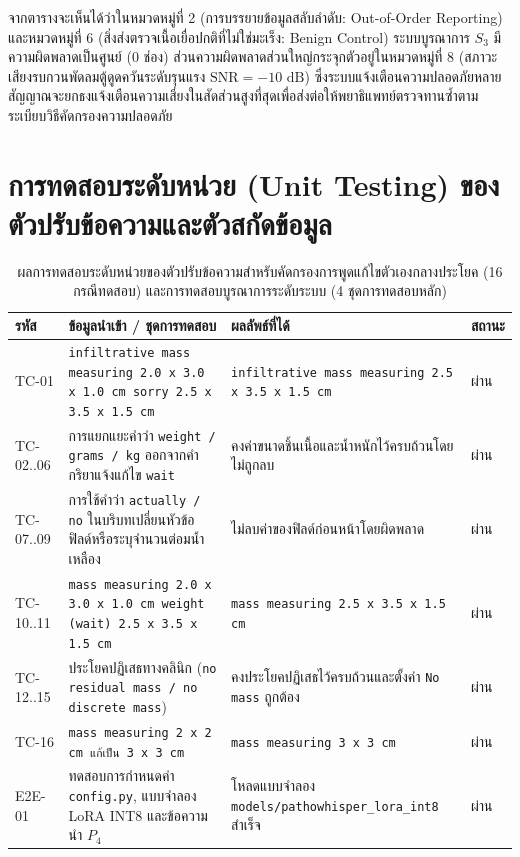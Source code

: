 \noindent จากตารางจะเห็นได้ว่าในหมวดหมู่ที่ 2 (การบรรยายข้อมูลสลับลำดับ: Out-of-Order Reporting) และหมวดหมู่ที่ 6 (สิ่งส่งตรวจเนื้อเยื่อปกติที่ไม่ใช่มะเร็ง: Benign Control) ระบบบูรณาการ $S_3$ มีความผิดพลาดเป็นศูนย์ ($0$ ช่อง) ส่วนความผิดพลาดส่วนใหญ่กระจุกตัวอยู่ในหมวดหมู่ที่ 8 (สภาวะเสียงรบกวนพัดลมตู้ดูดควันระดับรุนแรง $\mathrm{SNR} = -10\text{ dB}$) ซึ่งระบบแจ้งเตือนความปลอดภัยหลายสัญญาณจะยกธงแจ้งเตือนความเสี่ยงในสัดส่วนสูงที่สุดเพื่อส่งต่อให้พยาธิแพทย์ตรวจทานซ้ำตามระเบียบวิธีคัดกรองความปลอดภัย

\section*{การทดสอบระดับหน่วย (Unit Testing) ของตัวปรับข้อความและตัวสกัดข้อมูล}

\begin{table}[H]
\centering
\caption{ผลการทดสอบระดับหน่วยของตัวปรับข้อความสำหรับคัดกรองการพูดแก้ไขตัวเองกลางประโยค (16 กรณีทดสอบ) และการทดสอบบูรณาการระดับระบบ (4 ชุดการทดสอบหลัก)}
\label{tab:unit}
\footnotesize\setlength{\tabcolsep}{3.5pt}
\begin{tabular}{|p{1.7cm}|p{5.0cm}|p{5.0cm}|p{1.4cm}|}
\hline
\textbf{รหัส} & \textbf{ข้อมูลนำเข้า / ชุดการทดสอบ} & \textbf{ผลลัพธ์ที่ได้} & \textbf{สถานะ} \\
\hline
TC-01 & \texttt{infiltrative mass measuring 2.0 x 3.0 x 1.0 cm sorry 2.5 x 3.5 x 1.5 cm} & \texttt{infiltrative mass measuring 2.5 x 3.5 x 1.5 cm} & ผ่าน \\
\hline
TC-02..06 & การแยกแยะคำว่า \texttt{weight / grams / kg} ออกจากคำกริยาแจ้งแก้ไข \texttt{wait} & คงค่าขนาดชิ้นเนื้อและน้ำหนักไว้ครบถ้วนโดยไม่ถูกลบ & ผ่าน \\
\hline
TC-07..09 & การใช้คำว่า \texttt{actually / no} ในบริบทเปลี่ยนหัวข้อฟิลด์หรือระบุจำนวนต่อมน้ำเหลือง & ไม่ลบค่าของฟิลด์ก่อนหน้าโดยผิดพลาด & ผ่าน \\
\hline
TC-10..11 & \texttt{mass measuring 2.0 x 3.0 x 1.0 cm weight (wait) 2.5 x 3.5 x 1.5 cm} & \texttt{mass measuring 2.5 x 3.5 x 1.5 cm} & ผ่าน \\
\hline
TC-12..15 & ประโยคปฏิเสธทางคลินิก (\texttt{no residual mass / no discrete mass}) & คงประโยคปฏิเสธไว้ครบถ้วนและตั้งค่า \texttt{No mass} ถูกต้อง & ผ่าน \\
\hline
TC-16 & \texttt{mass measuring 2 x 2 cm แก้เป็น 3 x 3 cm} & \texttt{mass measuring 3 x 3 cm} & ผ่าน \\
\hline
E2E-01 & ทดสอบการกำหนดค่า \texttt{config.py}, แบบจำลอง LoRA INT8 และข้อความนำ $P_4$ & โหลดแบบจำลอง \texttt{models/pathowhisper\_lora\_int8} สำเร็จ & ผ่าน \\

\end{tabular}
\end{table}
